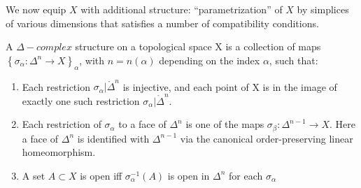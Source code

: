 \documentclass[11pt,a4paper]{report}
\begin{document}
             We now equip $X$ with additional structure: ``parametrization'' of $X$ by simplices of various dimensions that satisfies a number of 	
             compatibility conditions.	
             	
		      \begin{defn}\label{Delta-complex}	
		      	A $\Delta-complex$ structure on a topological space X is a collection of maps $\left\{\sigma_\alpha: \Delta^n \rightarrow X\right\}_\alpha $,	
		      	with $n=n(\alpha)$ depending on the index $\alpha$, such that:	
                    \begin{enumerate}	
                        \item Each restriction $\sigma_\alpha | \mathring{\Delta}^n$ is                      injective, and each point of X is in the image of exactly one such	
                        restriction $\sigma_\alpha | \mathring{\Delta}^n$.	
                        \item Each restriction of $\sigma_\alpha$ to a face of $\Delta^n$ is one of the  maps	
                        $\sigma_\beta: \Delta^{n-1} \rightarrow X $. Here a face of $\Delta^n$ is identified with $\Delta^{n-1}$ 	
                        via the canonical order-preserving linear homeomorphism. 	
                        \item A set $A \subset X$ is open iff $\sigma^{-1}_{\alpha}(A)$ is open in $\Delta^n$ for each $\sigma_\alpha$	
                    \end{enumerate}	
		      \end{defn}	
			
		     	
		     	
\end{document}
